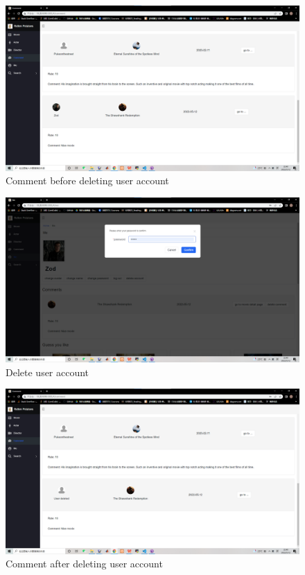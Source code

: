 \begin{CJK*}{UTF8}{gbsn}
    \begin{figure}[htbp]
    \centering
    \includegraphics[width=1\textwidth]{res_comment3.png}
    \caption{Comment before deleting user account}
    \end{figure}
    
    \begin{figure}[htbp]
    \centering
    \includegraphics[width=1\textwidth]{res_delete1.png}
    \caption{Delete user account}
    \end{figure}
    
    \begin{figure}[htbp]
    \centering
    \includegraphics[width=1\textwidth]{res_delete2.png}
    \caption{Comment after deleting user account}
    \end{figure}
\end{CJK*}

